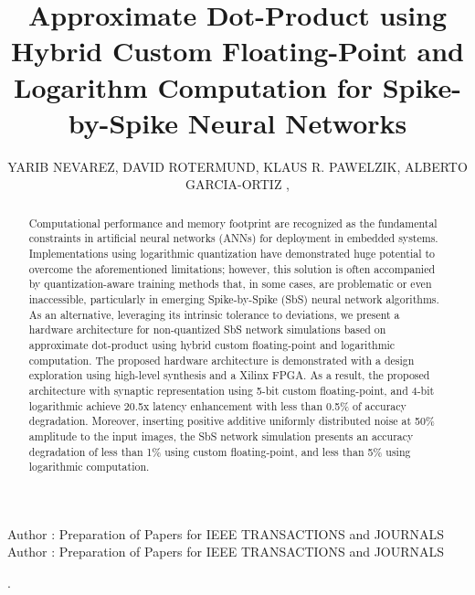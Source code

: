 \title {Approximate Dot-Product using Hybrid Custom Floating-Point and Logarithm Computation for Spike-by-Spike Neural Networks}

\author{
	\uppercase{Yarib Nevarez},	
	\uppercase{David Rotermund},
	\uppercase{Klaus R. Pawelzik},
	\uppercase{Alberto Garcia-Ortiz} ,
}

\address[1]{Institute of Electrodynamics and Microelectronics, University of Bremen, Bremen 28359, Germany (e-mail: nevarez@item.uni-bremen.de)}

\address[2]{Institute for Theoretical Physics, University of Bremen, Bremen 28359, Germany (e-mail: davrot@@neuro.uni-bremen.de)}

\address[3]{Institute for Theoretical Physics, University of Bremen, Bremen 28359, Germany (e-mail: pawelzik@@neuro.uni-bremen.de)}

\address[4]{Institute of Electrodynamics and Microelectronics, University of Bremen, Bremen 28359, Germany (e-mail: agaracia@item.uni-bremen.de)}


\markboth
{Author \headeretal: Preparation of Papers for IEEE TRANSACTIONS and JOURNALS}
{Author \headeretal: Preparation of Papers for IEEE TRANSACTIONS and JOURNALS}

.

\begin{abstract}
	Computational performance and memory footprint are recognized as the fundamental constraints in artificial neural networks (ANNs) for deployment in embedded systems. Implementations using logarithmic quantization have demonstrated huge potential to overcome the aforementioned limitations; however, this solution is often accompanied by quantization-aware training methods that, in some cases, are problematic or even inaccessible, particularly in emerging Spike-by-Spike (SbS) neural network algorithms. As an alternative, leveraging its intrinsic tolerance to deviations, we present a hardware architecture for non-quantized SbS network simulations based on approximate dot-product using hybrid custom floating-point and logarithmic computation. The proposed hardware architecture is demonstrated with a design exploration using high-level synthesis and a Xilinx FPGA. As a result, the proposed architecture with synaptic representation using 5-bit custom floating-point, and 4-bit logarithmic achieve 20.5x latency enhancement with less than 0.5\% of accuracy degradation. Moreover, inserting positive additive uniformly distributed noise at 50\% amplitude to the input images, the SbS network simulation presents an accuracy degradation of less than 1\% using custom floating-point, and less than 5\% using logarithmic computation.
	
\end{abstract}


